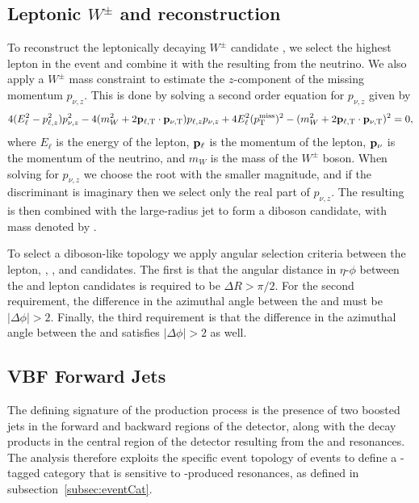 \subsection{Leptonic $W^\pm$ and \WV reconstruction}

To reconstruct the leptonically decaying $W^\pm$ candidate \Wlep, we select the highest \pt lepton in the event and combine it with the \ptmissTI resulting from the neutrino.
We also apply a $W^\pm$ mass constraint to estimate the $z$-component of the missing momentum $p_{\nu,z}$.
This is done by solving a second order equation for $p_{\nu,z}$ given by
\begin{equation}
  4(E_\ell^2-p_{\ell,z}^2)p_{\nu,z}^2-4(m_W^2+2\vb{p}_{\ell,\mathrm{T}}\cdot\vb{p}_{\nu,\mathrm{T}})p_{\ell,z}p_{\nu,z}+4E_\ell^2(p_\mathrm{T}^\mathrm{miss})^2-(m_W^2+2\vb{p}_{\ell,\mathrm{T}}\cdot\vb{p}_{\nu,\mathrm{T}})^2=0,
\end{equation}
where $E_\ell$ is the energy of the lepton, $\vb{p}_\ell$ is the momentum of the lepton, $\vb{p}_\nu$ is the momentum of the neutrino, and $m_W$ is the mass of the $W^\pm$ boson.
When solving for $p_{\nu,z}$ we choose the root with the smaller magnitude, and if the discriminant is imaginary then we select only the real part of $p_{\nu,z}$.
The resulting \Wlep is then combined with the large-radius \Vhad jet to form a diboson candidate, with mass denoted by \MVV.

To select a diboson-like topology we apply angular selection criteria between the lepton, \Vhad, \Wlep, and \ptmissTI candidates.
The first is that the angular distance in $\eta$-$\phi$ between the \Vhad and lepton candidates is required to be $\Delta R>\pi/2$.
For the second requirement, the difference in the azimuthal angle between the \Vhad and \ptmissTI must be $|\Delta\phi|>2$.
Finally, the third requirement is that the difference in the azimuthal angle between the \Vhad and \Wlep satisfies $|\Delta\phi|>2$ as well.

\subsection{VBF Forward Jets}
\label{subsec:VBFjets}

The defining signature of the \VBF production process is the presence of two boosted jets in the forward and backward regions of the detector, along with the decay products in the central region of the detector resulting from the \Wlep and \Vhad resonances.
The analysis therefore exploits the specific event topology of \VBF events to define a \VBF-tagged category that is sensitive to \VBF-produced resonances, as defined in subsection~\ref{subsec:eventCat}.

